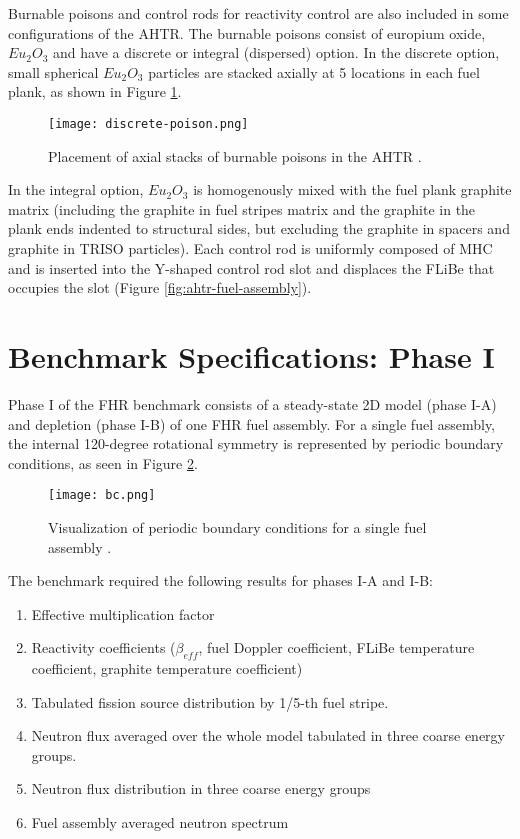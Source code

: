 Burnable poisons and control rods for reactivity control are also included in 
some configurations of the \gls{AHTR}. 
The burnable poisons consist of europium oxide, $Eu_2O_3$ and have a discrete
or integral (dispersed) option. 
In the discrete option, small spherical $Eu_2O_3$ particles are stacked axially 
at 5 locations in each fuel plank, as shown in Figure \ref{fig:discrete-poison}. 
\begin{figure}[]
    \centering
    \texttt{[image: discrete-poison.png]} 
    \caption{Placement of axial stacks of burnable poisons in the \acrlong{AHTR} 
    \cite{noauthor_fluoride_nodate}.}
    \label{fig:discrete-poison}
\end{figure}
In the integral option, $Eu_2O_3$ is homogenously mixed with the fuel plank 
graphite matrix (including the graphite in fuel stripes matrix and the 
graphite in the plank ends indented to structural sides, but excluding the 
graphite in spacers and graphite in TRISO particles). 
Each control rod is uniformly composed of \gls{MHC} and is inserted into the 
Y-shaped control rod slot and displaces the \gls{FLiBe} that occupies the slot
(Figure \ref{fig:ahtr-fuel-assembly}). 

\section{Benchmark Specifications: Phase I}
\label{sec:phase1}
Phase I of the \gls{FHR} benchmark consists of a steady-state 2D model 
(phase I-A) and depletion (phase I-B) of one \gls{FHR} fuel assembly. 
For a single fuel assembly, the internal 120-degree rotational symmetry is 
represented by periodic boundary conditions, as seen in Figure \ref{fig:bc}. 
\begin{figure}[]
    \centering
    \texttt{[image: bc.png]} 
    \caption{Visualization of periodic boundary conditions for a single fuel 
    assembly \cite{noauthor_fluoride_nodate}.}
    \label{fig:bc}
\end{figure}
The benchmark required the following results for phases I-A and I-B:
\begin{enumerate}[label=(\alph*)]
    \item Effective multiplication factor 
    \item Reactivity coefficients ($\beta_{eff}$, fuel Doppler coefficient, FLiBe 
    temperature coefficient, graphite temperature coefficient)
    \item Tabulated fission source distribution by 1/5-th fuel stripe. 
    \item Neutron flux averaged over the whole model tabulated in three coarse energy groups. 
    \item Neutron flux distribution in three coarse energy groups
    \item Fuel assembly averaged neutron spectrum
\end{enumerate}

